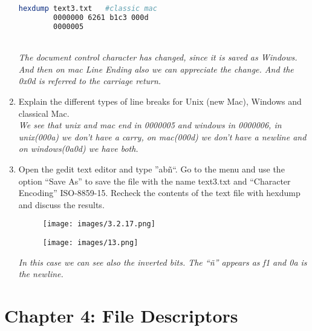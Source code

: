 \documentclass[12pt, titlepage,]{article}
\begin{document}
\begin{enumerate}
\begin{lstlisting}[language=Bash]
        hexdump text3.txt   #classic mac
        0000000 6261 b1c3 000d                         
        0000005

        \end{lstlisting}
 


\\
 \textit{\color{blue}The document control character has changed, since it is saved as Windows. And then on mac Line Ending also we can appreciate the change. And the 0x0d is referred to the carriage return.}  

\clearpage
    \item Explain the different types of line breaks for Unix (new Mac), Windows and classical Mac. 
    \\
    \textit{\color{blue}We see that unix and mac end in 0000005 and windows in 0000006, in
unix(000a) we don't have a carry, on mac(000d) we don't have a newline and on
windows(0a0d) we have both.}  


    \item Open the gedit text editor and type ”abñ“. Go to the menu and use the option “Save As” to save the file with the name text3.txt and “Character Encoding” ISO-8859-15. Recheck the contents of the text file with hexdump and discuss the results.
    \\
    \begin{figure}[h] %
    \centering
    \texttt{[image: images/3.2.17.png]}
\end{figure}
\begin{figure}[h] %
    \centering
    \texttt{[image: images/13.png]}
\end{figure} 
    
    \textit{\color{blue}In this case we can see also the inverted bits. The “ñ” appears as f1 and 0a is the newline.}
    


\end{enumerate}
\clearpage

\section{Chapter 4: File Descriptors}
\end{document}

